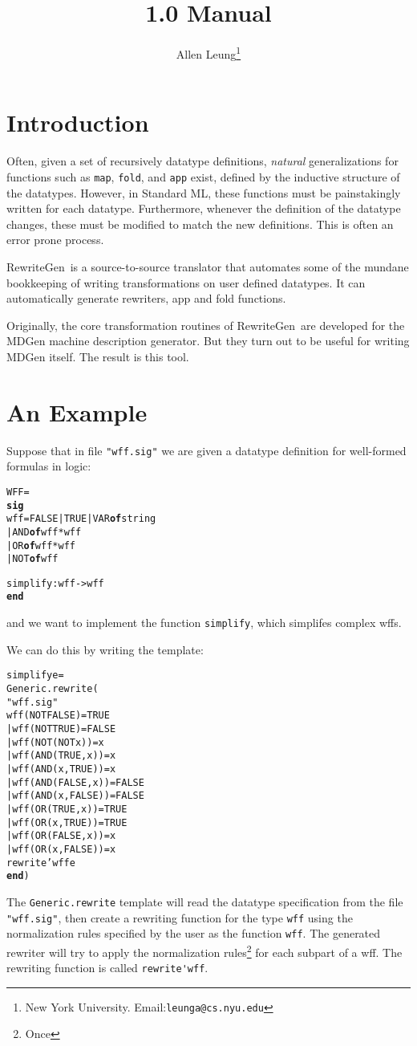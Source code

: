 \documentclass{article}
\title{\RewriteGen{} 1.0 Manual}
\author{Allen Leung\thanks{New York University. Email:{\tt leunga@cs.nyu.edu}}}
\newcommand{\RewriteGen}{{\sf RewriteGen}}
\newcommand{\END}{{\bf end}}
\newcommand{\OF}{{\bf of}}
\newcommand{\SIG}{{\bf sig}}
\begin{document}
   \maketitle
\section{Introduction}
Often, given a set of recursively
datatype definitions, {\em natural} generalizations for 
functions such as \verb|map|,
\verb|fold|, and \verb|app| exist, defined by the inductive structure
of the datatypes.  However, in Standard ML, these functions
must be painstakingly written for each datatype.  Furthermore, whenever
the definition of the datatype changes, these must be modified to match
the new definitions.  This is often an error prone process.

\RewriteGen\ is a source-to-source translator that automates some of the
mundane bookkeeping of writing transformations on user defined datatypes.  
It can automatically generate rewriters, app and fold functions.

Originally, the core transformation routines of \RewriteGen\ 
are developed for the MDGen machine description generator.
But they turn out to be useful for writing MDGen itself.  
The result is this tool.

\section{An Example}
Suppose that in file \verb|"wff.sig"| 
we are given a datatype definition for well-formed formulas in logic:
\begin{alltt}
\SIGNATURE WFF =
\SIG
   \DATATYPE wff = FALSE | TRUE | VAR \OF string
                | AND \OF wff * wff
                | OR \OF wff * wff
                | NOT \OF wff 

   \VAL simplify : wff -> wff
\END
\end{alltt}
\noindent and we want to implement the function \verb|simplify|,
which simplifes complex wffs.

We can do this by writing the template:
\begin{alltt}
   \FUN simplify e = 
       Generic.rewrite(
       \LET \INCLUDE "wff.sig"
           \FUN wff (NOT FALSE) = TRUE
             | wff (NOT TRUE) = FALSE
             | wff (NOT(NOT x)) = x
             | wff (AND(TRUE,x)) = x
             | wff (AND(x,TRUE)) = x
             | wff (AND(FALSE,x)) = FALSE
             | wff (AND(x,FALSE)) = FALSE
             | wff (OR(TRUE,x)) = TRUE
             | wff (OR(x,TRUE)) = TRUE
             | wff (OR(FALSE,x)) = x
             | wff (OR(x,FALSE)) = x
       \IN  rewrite'wff e
       \END)
\end{alltt}
The \verb|Generic.rewrite| 
template will read the datatype specification from the
file \verb|"wff.sig"|,
then create a rewriting function for the type \verb|wff| using the
normalization rules specified by the user as the function \verb|wff|.  
The generated rewriter 
will try to apply the normalization rules\footnote{Once} for each
subpart of a wff.  The rewriting function
is called \verb|rewrite'wff|.
\end{document}
